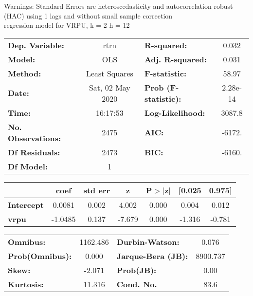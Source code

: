 Warnings: \newline
 [1] Standard Errors are heteroscedasticity and autocorrelation robust (HAC) using 1 lags and without small sample correction\\ 

regression model for VRPU, k = 2 h = 12\begin{center}
\begin{tabular}{lclc}
\toprule
\textbf{Dep. Variable:}    &       rtrn       & \textbf{  R-squared:         } &     0.032   \\
\textbf{Model:}            &       OLS        & \textbf{  Adj. R-squared:    } &     0.031   \\
\textbf{Method:}           &  Least Squares   & \textbf{  F-statistic:       } &     58.97   \\
\textbf{Date:}             & Sat, 02 May 2020 & \textbf{  Prob (F-statistic):} &  2.28e-14   \\
\textbf{Time:}             &     16:17:53     & \textbf{  Log-Likelihood:    } &    3087.8   \\
\textbf{No. Observations:} &        2475      & \textbf{  AIC:               } &    -6172.   \\
\textbf{Df Residuals:}     &        2473      & \textbf{  BIC:               } &    -6160.   \\
\textbf{Df Model:}         &           1      & \textbf{                     } &             \\
\bottomrule
\end{tabular}
\begin{tabular}{lcccccc}
                   & \textbf{coef} & \textbf{std err} & \textbf{z} & \textbf{P$> |$z$|$} & \textbf{[0.025} & \textbf{0.975]}  \\
\midrule
\textbf{Intercept} &       0.0081  &        0.002     &     4.002  &         0.000        &        0.004    &        0.012     \\
\textbf{vrpu}      &      -1.0485  &        0.137     &    -7.679  &         0.000        &       -1.316    &       -0.781     \\
\bottomrule
\end{tabular}
\begin{tabular}{lclc}
\textbf{Omnibus:}       & 1162.486 & \textbf{  Durbin-Watson:     } &    0.076  \\
\textbf{Prob(Omnibus):} &   0.000  & \textbf{  Jarque-Bera (JB):  } & 8900.737  \\
\textbf{Skew:}          &  -2.071  & \textbf{  Prob(JB):          } &     0.00  \\
\textbf{Kurtosis:}      &  11.316  & \textbf{  Cond. No.          } &     83.6  \\
\bottomrule
\end{tabular}
\end{center}

